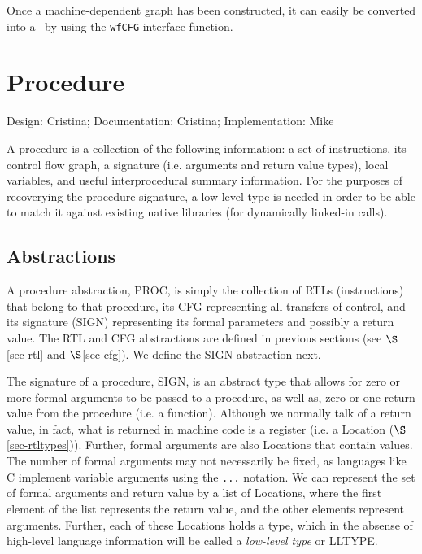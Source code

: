 Once a machine-dependent graph has been constructed, it can easily
be converted into a \wfCFG\ by using the \texttt{wfCFG} interface
function. 


\section{Procedure}
\label{sec-ir-proc}
{\small
\begin{flushright}
Design: Cristina; Documentation: Cristina; Implementation: Mike
\end{flushright} 
}

A procedure is a collection of the following information: a set of 
instructions, its control flow graph, a signature (i.e. arguments 
and return value types), local variables, and useful interprocedural
summary information.
For the purposes of recoverying the procedure signature, a low-level
type is needed in order to be able to match it against existing
native libraries (for dynamically linked-in calls).  


\subsection{Abstractions}
A procedure abstraction, PROC, is simply the collection of 
RTLs (instructions) that belong to that procedure, its CFG representing 
all transfers of control, and its signature (SIGN) representing 
its formal parameters and possibly a return value.
The RTL and CFG abstractions are defined in previous 
sections (see $\S$\ref{sec-rtl} and $\S$\ref{sec-cfg}). 
We define the SIGN abstraction next.

The signature of a procedure, SIGN, is an abstract type that allows 
for zero or more formal arguments to be passed to a procedure,
as well as, zero or one return value from the procedure (i.e. a function).   
Although we normally talk of a return value, in fact, what 
is returned in machine code is a register (i.e. a Location 
($\S$\ref{sec-rtltypes})).  Further, formal arguments are 
also Locations that contain values.  The number of formal 
arguments may not necessarily be fixed, as languages like C
implement variable arguments using the \texttt{...} notation. 
We can represent the set of formal arguments and return value by a list 
of Locations, where the first element of the list represents the return 
value, and the other elements represent arguments. 
Further, each of these Locations holds a type, which in the
absense of high-level language information will be called a 
\emph{low-level type} or LLTYPE.   

